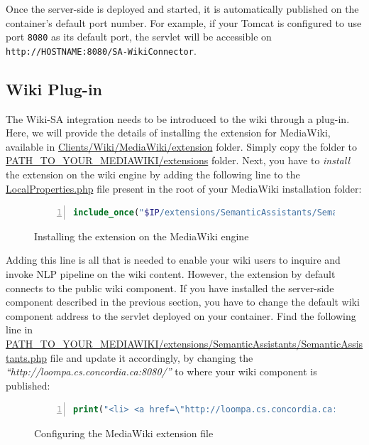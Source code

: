 Once the server-side is deployed and started, it is automatically published on the container's default port number. For example, if your Tomcat is configured to use port \texttt{8080} as its default port, the servlet will be accessible on \texttt{http://HOSTNAME:8080/SA-WikiConnector}.

\subsection{Wiki Plug-in}
The Wiki-SA integration needs to be introduced to the wiki through a plug-in. Here, we will provide the details of installing the \sa extension for MediaWiki, available in \url{Clients/Wiki/MediaWiki/extension} folder. Simply copy the \texttt{\sa} folder to \url{PATH_TO_YOUR_MEDIAWIKI/extensions} folder. Next, you have to \emph{install} the extension on the wiki engine by adding the following line to the \url{LocalProperties.php} file present in the root of your MediaWiki installation folder:

\begin{figure}[h!]
\centering
\begin{lstlisting}[language=PHP,numbers=left,xleftmargin=4mm,columns=flexible]
include_once("$IP/extensions/SemanticAssistants/SemanticAssistants.php");
\end{lstlisting}
\caption{Installing the \sa extension on the MediaWiki engine}
\label{list:mediawiki_sa_extension_install}
\end{figure}

Adding this line is all that is needed to enable your wiki users to inquire and invoke NLP pipeline on the wiki content. However, the extension by default connects to the public \sa wiki component. If you have installed the server-side component described in the previous section, you have to change the default wiki component address to the servlet deployed on your container. Find the following line in \url{PATH_TO_YOUR_MEDIAWIKI/extensions/SemanticAssistants/SemanticAssistants.php} file and update it accordingly, by changing the \emph{``http://loompa.cs.concordia.ca:8080/''} to where your wiki component is published:

\begin{figure}[h!]
\centering
\begin{lstlisting}[language=PHP,numbers=left,xleftmargin=4mm,columns=flexible]
print("<li> <a href=\"http://loompa.cs.concordia.ca:8080/SA-WikiConnector/SemAssistServlet?action=proxy\">Semantic Assistants</a></li>");\end{lstlisting}
\caption{Configuring the \sa MediaWiki extension file}
\label{list:mediawiki_sa_extension_config}
\end{figure}

